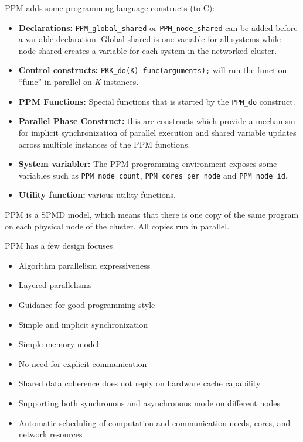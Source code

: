PPM adds some programming language constructs (to C):

\begin{itemize}
	\item \textbf{Declarations:} \texttt{PPM\_global\_shared} or
		\texttt{PPM\_node\_shared} can be added before a variable declaration.
		Global shared is one variable for all systems while node shared creates
		a variable for each system in the networked cluster.
	\item \textbf{Control constructs:} \texttt{PKK\_do(K) func(arguments);}
		will run the function ``func'' in parallel on \emph{K} instances.
	\item \textbf{PPM Functions:} Special functions that is started by the
		\texttt{PPM\_do} construct.
	\item \textbf{Parallel Phase Construct:} this are constructs which provide
		a mechanism for implicit synchronization of parallel execution and
		shared variable updates across multiple instances of the PPM functions.
	\item \textbf{System variabler:} The PPM programming environment exposes
		some variables such as \texttt{PPM\_node\_count},
		\texttt{PPM\_cores\_per\_node} and \texttt{PPM\_node\_id}.
	\item \textbf{Utility function:} various utility functions.
\end{itemize}

PPM is a SPMD model, which means that there is one copy of the same program on
each physical node of the cluster. All copies run in parallel.

PPM has a few design focuses

\begin{itemize}
	\item Algorithm parallelism expressiveness
	\item Layered parallelisms
	\item Guidance for good programming style
	\item Simple and implicit synchronization
	\item Simple memory model
	\item No need for explicit communication
	\item Shared data coherence does not reply on hardware cache capability
	\item Supporting both synchronous and asynchronous mode on different nodes
	\item Automatic scheduling of computation and communication needs, cores,
		and network resources
\end{itemize}

